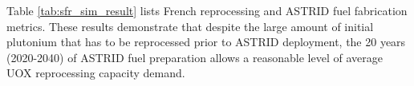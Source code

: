 Table \ref{tab:sfr_sim_result} lists French reprocessing and 
 \gls{ASTRID} fuel fabrication metrics.
These results demonstrate that despite the large amount of initial plutonium that has to be reprocessed
prior to \gls{ASTRID} deployment, the 20 years (2020-2040) of 
\gls{ASTRID} fuel preparation
allows a reasonable level of average
\gls{UOX} reprocessing capacity demand.

